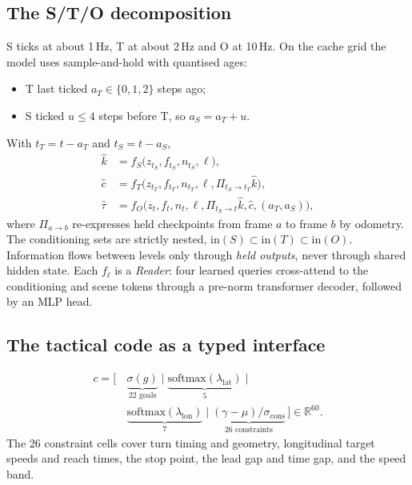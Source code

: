 \documentclass[10pt,twocolumn]{article}
\theoremstyle{remark}
\newcommand{\Rset}{\mathbb{R}}
\begin{document}
\subsection{The S/T/O decomposition}
S ticks at about 1\,Hz, T at about 2\,Hz and O at 10\,Hz. On the cache grid the model uses sample-and-hold with quantised ages:
\begin{itemize}
  \item T last ticked $a_T\in\{0,1,2\}$ steps ago;
  \item S ticked $u\le4$ steps before T, so $a_S=a_T+u$.
\end{itemize}
With $t_T=t-a_T$ and $t_S=t-a_S$,
\begin{equation}
\begin{aligned}
\hat k&=f_S\big(z_{t_S},f_{t_S},n_{t_S},\ell\big),\\
\hat c&=f_T\big(z_{t_T},f_{t_T},n_{t_T},\ell,\Pi_{t_S\to t_T}\hat k\big),\\
\hat\tau&=f_O\big(z_t,f_t,n_t,\ell,\Pi_{t_S\to t}\hat k,\hat c,(a_T,a_S)\big),
\end{aligned}
\end{equation}
where $\Pi_{a\to b}$ re-expresses held checkpoints from frame $a$ to frame $b$ by odometry. The conditioning sets are strictly nested,
$\mathrm{in}(S)\subset\mathrm{in}(T)\subset\mathrm{in}(O)$. Information flows between levels only through \emph{held outputs}, never
through shared hidden state. Each $f_\ell$ is a \emph{Reader}: four learned queries cross-attend to the conditioning and scene tokens
through a pre-norm transformer decoder, followed by an MLP head.

\subsection{The tactical code as a typed interface}
\begin{equation}
\begin{aligned}
c=\big[\,&\underbrace{\sigma(g)}_{22\text{ goals}}\;\big|\;\underbrace{\mathrm{softmax}(\lambda_{\mathrm{lat}})}_{5}\;\big|\\
&\underbrace{\mathrm{softmax}(\lambda_{\mathrm{lon}})}_{7}\;\big|\;\underbrace{(\gamma-\mu)/\sigma_{\mathrm{cons}}}_{26\text{ constraints}}\,\big]\in\Rset^{60}.
\end{aligned}
\end{equation}
The 26 constraint cells cover turn timing and geometry, longitudinal target speeds and reach times, the stop point, the lead gap and
time gap, and the speed band.
\end{document}
